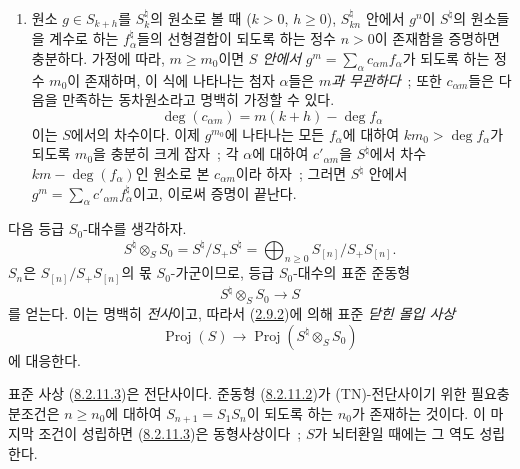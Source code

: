\begin{enumerate}
\item[\rm(iv)] 원소 $g\in S_{k+h}$를 $S_k^\natural$의 원소로 볼 때
($k>0$, $h\geq0$), $S_{kn}^\natural$ 안에서 $g^n$이
$S^\natural$의 원소들을 계수로 하는 $f_\alpha^\natural$들의
선형결합이 되도록 하는 정수 $n>0$이 존재함을 증명하면 충분하다.
가정에 따라, $m\geq m_0$이면 
\emph{$S$ 안에서} $g^m=\sum_\alpha c_{\alpha m}f_\alpha$가 되도록 하는
정수 $m_0$이 존재하며, 이 식에 나타나는 첨자 $\alpha$들은
\emph{$m$과 무관하다}~; 또한 $c_{\alpha m}$들은 다음을 만족하는
동차원소라고 명백히 가정할 수 있다.
\[
  \deg(c_{\alpha m})=m(k+h)-\deg f_\alpha
\]
이는 $S$에서의 차수이다. 이제 $g^{m_0}$에 나타나는 모든
$f_\alpha$에 대하여 $km_0>\deg f_\alpha$가 되도록 $m_0$을 충분히
크게 잡자~; 각 $\alpha$에 대하여 $c'_{\alpha m}$을
$S^\natural$에서 차수 $km-\deg(f_\alpha)$인 원소로 본
$c_{\alpha m}$이라 하자~; 그러면 $S^\natural$ 안에서
$g^m=\sum_\alpha c'_{\alpha m}f_\alpha^\natural$이고, 이로써 증명이 끝난다.
\end{enumerate}

\begin{env}[8.2.11]
\label{II.8.2.11-ko}
다음 등급 $S_0$-대수를 생각하자.
\begin{equation}
\label{II.8.2.11.1-ko}
  S^\natural\otimes_S S_0=S^\natural/S_+S^\natural
  =\bigoplus_{n\geq0}S_{[n]}/S_+S_{[n]}.
\tag{8.2.11.1}
\end{equation}
$S_n$은 $S_{[n]}/S_+S_{[n]}$의 몫 $S_0$-가군이므로, 등급
$S_0$-대수의 표준 준동형
\begin{equation}
\label{II.8.2.11.2-ko}
  S^\natural\otimes_S S_0\to S
\tag{8.2.11.2}
\end{equation}
를 얻는다. 이는 명백히 
\emph{전사}이고, 따라서 (\hyperref[II.2.9.2-ko]{2.9.2})에 의해 표준
\emph{닫힌 몰입 사상}
\begin{equation}
\label{II.8.2.11.3-ko}
  \operatorname{Proj}(S)\to
  \operatorname{Proj}(S^\natural\otimes_S S_0)
\tag{8.2.11.3}
\end{equation}
에 대응한다.
\end{env}


\begin{proposition}[8.2.12]
\label{II.8.2.12-ko}
표준 사상 (\hyperref[II.8.2.11.3-ko]{8.2.11.3})은 전단사이다.
준동형 (\hyperref[II.8.2.11.2-ko]{8.2.11.2})가 (TN)-전단사이기 위한
필요충분조건은 $n\geq n_0$에 대하여 $S_{n+1}=S_1S_n$이 되도록 하는
$n_0$가 존재하는 것이다. 이 마지막 조건이 성립하면
(\hyperref[II.8.2.11.3-ko]{8.2.11.3})은 동형사상이다~;
$S$가 뇌터환일 때에는 그 역도 성립한다.
\end{proposition}

